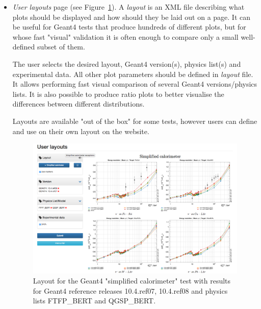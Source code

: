 \begin{itemize}
\item \textit{User layouts} page (see Figure~\ref{fig:layouts}). A \textit{layout} is an XML file describing what plots should be displayed and how should they be laid out on a page. It can be useful for Geant4 tests that produce hundreds of different plots, but for whose fast "visual" validation it is often enough to compare only a small well-defined subset of them.

The user selects the desired layout, Geant4 version(s), physics list(s) and experimental data. All other plot parameters should be defined in \textit{layout} file. It allows performing fast visual comparison of several Geant4 versions/physics lists. It is also possible to produce ratio plots to better visualise the differences between different distributions.

Layouts are available "out of the box" for some tests, however users can define and use on their own layout on the website.

\begin{figure}[h]
    \centering
    \includegraphics[width=\textwidth,clip]{layout_sc.png}
    \caption{Layout for the Geant4 "simplified calorimeter" test with results for Geant4 reference releases 10.4.ref07, 10.4.ref08 and physics lists FTFP\_BERT and QGSP\_BERT.}
    \label{fig:layouts}
\end{figure}

\end{itemize}

